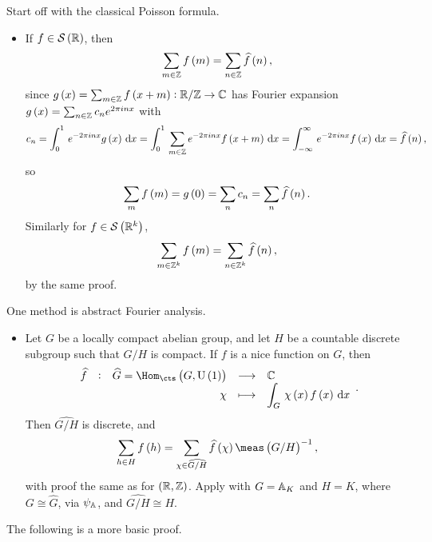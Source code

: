 
Start off with the classical Poisson formula.
\begin{itemize}
\item If $ f \in \SSS\br{\RR} $, then
$$ \sum_{m \in \ZZ} f\br{m} = \sum_{n \in \ZZ} \widehat{f}\br{n}, $$
since $ g\br{x} = \sum_{m \in \ZZ} f\br{x + m} : \RR / \ZZ \to \CC $ has Fourier expansion $ g\br{x} = \sum_{n \in \ZZ} c_ne^{2\pi inx} $ with
$$ c_n = \intd{0}{1}{e^{-2\pi inx}g\br{x}}{x} = \intd{0}{1}{\sum_{m \in \ZZ} e^{-2\pi inx}f\br{x + m}}{x} = \intd{-\infty}{\infty}{e^{-2\pi inx}f\br{x}}{x} = \widehat{f}\br{n}, $$
so
$$ \sum_m f\br{m} = g\br{0} = \sum_n c_n = \sum_n \widehat{f}\br{n}. $$
Similarly for $ f \in \SSS\br{\RR^k} $,
$$ \sum_{m \in \ZZ^k} f\br{m} = \sum_{n \in \ZZ^k} \widehat{f}\br{n}, $$
by the same proof.
\end{itemize}
One method is abstract Fourier analysis.
\begin{itemize}
\item Let $ G $ be a locally compact abelian group, and let $ H $ be a countable discrete subgroup such that $ G / H $ is compact. If $ f $ is a nice function on $ G $, then
$$ \function[\widehat{f}]{\widehat{G} = \Hom_{\cts}\br{G, \U\br{1}}}{\CC}{\chi}{\intd{G}{}{\chi\br{x}f\br{x}}{x}}. $$
Then $ \widehat{G / H} $ is discrete, and
$$ \sum_{h \in H} f\br{h} = \sum_{\chi \in \widehat{G / H}} \widehat{f}\br{\chi}\meas\br{G / H}^{-1}, $$
with proof the same as for $ \br{\RR, \ZZ} $. Apply with $ G = \AA_K $ and $ H = K $, where $ G \cong \widehat{G} $, via $ \psi_\AA $, and $ \widehat{G / H} \cong H $.
\end{itemize}

The following is a more basic proof.

